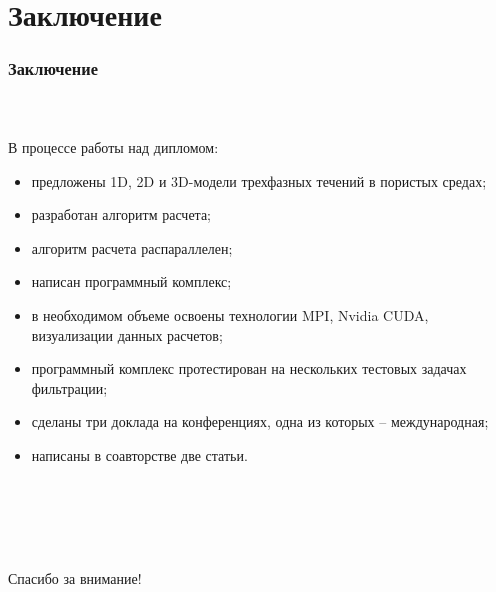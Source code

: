 \documentclass[10pt,pdf,hyperref={unicode}]{beamer} %
\begin{document}
\section{Заключение}
\begin{frame}
\begin{center}
\frametitle{Заключение}
\framesubtitle{\ }
В процессе работы над дипломом:
\begin{itemize}
  \item предложены 1D, 2D и 3D-модели трехфазных течений в пористых средах;
  \item разработан алгоритм расчета;
  \item алгоритм расчета распараллелен;
  \item написан программный комплекс;
  \item в необходимом объеме освоены технологии MPI, Nvidia CUDA, визуализации данных расчетов;
  \item программный комплекс протестирован на нескольких тестовых задачах 
  фильтрации;
  \item сделаны три доклада на конференциях, одна из которых -- международная;
  \item написаны в соавторстве две статьи.
\end{itemize}
\end{center}
\end{frame}

\begin{frame}
\begin{center}
\frametitle{\ }
\framesubtitle{\ }
\item {\huge Спасибо за внимание!}
\end{center}
\end{frame}
\end{document}
